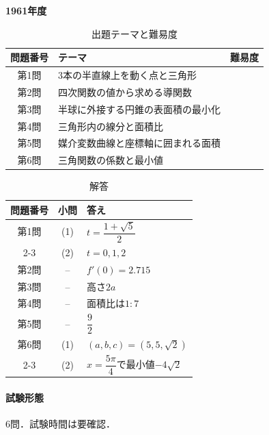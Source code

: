 \documentclass[../../main.tex]{subfiles}
\begin{document}
\begin{center}
  {\fontsize{48pt}{58pt}\selectfont \textbf{1961}\normalsize\textbf{年度}}
\end{center}

\begin{table}[htb]
  \centering
  \caption{出題テーマと難易度}
  \begin{tabular}{|c|p{9cm}|c|}
    \hline
    \textbf{問題番号} & \textbf{テーマ} & \textbf{難易度} \\
    \hline
    第1問 & 3本の半直線上を動く点と三角形 & \\
    \hline
    第2問 & 四次関数の値から求める導関数 & \\
    \hline
    第3問 & 半球に外接する円錐の表面積の最小化 & \\
    \hline
    第4問 & 三角形内の線分と面積比 & \\
    \hline
    第5問 & 媒介変数曲線と座標軸に囲まれる面積 & \\
    \hline
    第6問 & 三角関数の係数と最小値 & \\
    \hline
  \end{tabular}
\end{table}

\begin{table}[htb]
  \centering
  \caption{解答}
  \renewcommand{\arraystretch}{1.4}
  \begin{tabular}{|c|c|p{9cm}|}
    \hline
    \textbf{問題番号} & \textbf{小問} & \textbf{答え} \\
    \hline
    第1問 & (1) & $t=\dfrac{1+\sqrt{5}}{2}$ \\
    \cline{2-3}
    & (2) & $t=0,1,2$ \\
    \hline
    第2問 & -- & $f'(0)=2.715$ \\
    \hline
    第3問 & -- & 高さ$2a$ \\
    \hline
    第4問 & -- & 面積比は$1:7$ \\
    \hline
    第5問 & -- & $\dfrac{9}{2}$ \\
    \hline
    第6問 & (1) & $(a,b,c)=(5,5,\sqrt{2})$ \\
    \cline{2-3}
    & (2) & $x=\dfrac{5\pi}{4}$で最小値$-4\sqrt{2}$ \\
    \hline
  \end{tabular}
\end{table}

\paragraph{試験形態}
6問．試験時間は要確認．
\end{document}
